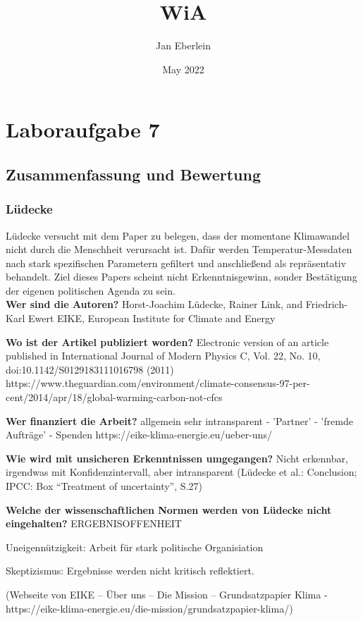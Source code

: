 \documentclass{article}
\title{WiA}
\author{Jan Eberlein}
\date{May 2022}
\begin{document}
\maketitle

\section{Laboraufgabe 7}

\subsection{Zusammenfassung und Bewertung}
\subsubsection*{Lüdecke}
Lüdecke versucht mit dem Paper zu belegen, dass der momentane Klimawandel nicht durch die Menschheit verursacht ist.
Dafür werden Temperatur-Messdaten nach stark spezifischen Parametern gefiltert und anschließend als repräsentativ behandelt.
Ziel dieses Papers scheint nicht Erkenntnisgewinn, sonder Bestätigung der eigenen politischen Agenda zu sein.
\\

\textbf{Wer sind die Autoren?}
Horst-Joachim Lüdecke, Rainer Link, and Friedrich-Karl Ewert
EIKE, European Institute for Climate and Energy

\textbf{Wo ist der Artikel publiziert worden?}
Electronic version of an article published in International Journal of Modern Physics
C, Vol. 22, No. 10, doi:10.1142/S0129183111016798 (2011)
https://www.theguardian.com/environment/climate-consensus-97-per-cent/2014/apr/18/global-warming-carbon-not-cfcs

\textbf{Wer finanziert die Arbeit?}
allgemein sehr intransparent
- 'Partner'
- 'fremde Aufträge'
- Spenden 
https://eike-klima-energie.eu/ueber-uns/

\textbf{Wie wird mit unsicheren Erkenntnissen umgegangen?}
Nicht erkennbar, irgendwas mit Konfidenzintervall, aber intransparent
(Lüdecke et al.: Conclusion; IPCC: Box “Treatment of uncertainty”, S.27)

\textbf{Welche der wissenschaftlichen Normen werden von Lüdecke nicht eingehalten?}
ERGEBNISOFFENHEIT

Uneigennützigkeit: Arbeit für stark politische Organisiation

Skeptizismus: Ergebnisse werden nicht kritisch reflektiert.

(Webseite von EIKE – Über uns – Die Mission – Grundsatzpapier Klima -
https://eike-klima-energie.eu/die-mission/grundsatzpapier-klima/)
\end{document}
